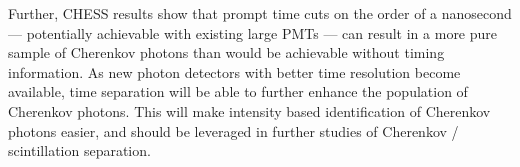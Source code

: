 Further, CHESS results show that prompt time cuts on the order of a nanosecond --- potentially achievable with existing large PMTs --- can result in a more pure sample of Cherenkov photons than would be achievable without timing information.
As new photon detectors with better time resolution become available, time separation will be able to further enhance the population of Cherenkov photons.
This will make intensity based identification of Cherenkov photons easier, and should be leveraged in further studies of Cherenkov / scintillation separation.
